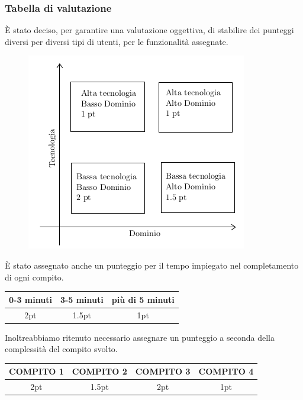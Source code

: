 \subsubsection{Tabella di valutazione}
\`{E} stato deciso, per garantire una valutazione oggettiva, di stabilire dei punteggi diversi per diversi tipi di utenti, per le funzionalità assegnate.
\begin{figure}[H]
  \centering
  \includegraphics{img/varie/tabella_usabilita_con_pt.png}
\end{figure}
\`{E} stato assegnato anche un punteggio per il tempo impiegato nel completamento di ogni compito.
\begin{table}[H]
  \begin{center}
    \def\arraystretch{1.5}
    \begin{tabular}{|c|c|c|}
      \hline
      \textbf{0-3 minuti} & \textbf{3-5 minuti} & \textbf{più di 5 minuti} \\
      \hline
      2pt                 & 1.5pt               & 1pt                      \\
      \hline
    \end{tabular}
  \end{center}
\end{table}
Inoltreabbiamo ritenuto necessario assegnare un punteggio a seconda della complessità del compito svolto.
\begin{table}[H]
  \begin{center}
    \def\arraystretch{1.5}
    \begin{tabular}{|c|c|c|c|}
      \hline
      \textbf{COMPITO 1} & \textbf{COMPITO 2} & \textbf{COMPITO 3} & \textbf{COMPITO 4} \\
      \hline
      2pt                & 1.5pt              & 2pt                  & 1pt                \\
      \hline
    \end{tabular}
  \end{center}
\end{table}
\newpage
